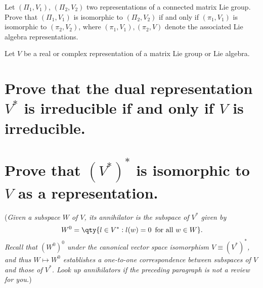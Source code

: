 \documentclass[
	pages,
	boxes,
	color=WildStrawberry
]{homework}
\begin{document}
\begin{problem}
Let $(\Pi_1, V_1)$, $(\Pi_2, V_2)$ two representations of a connected matrix Lie group. Prove that $(\Pi_1, V_1)$ is isomorphic to $(\Pi_2, V_2)$ if and only if $(\pi_1, V_1)$ is isomorphic to $(\pi_2, V_2)$, where $(\pi_1, V_1), (\pi_2, V)$ denote the associated Lie algebra representations.
\end{problem}

\begin{solution}

\end{solution}

\begin{problem}
Let $V$ be a real or complex representation of a matrix Lie group or Lie algebra.
\begin{parts}
	\part{Prove that the dual representation $V^*$ is irreducible if and only if $V$ is irreducible.}\label{part:3a}
	\part{Prove that $(V^*)^*$ is isomorphic to $V$ as a representation.}\label{part:3b}

	(\textit{Given a subspace $W$ of $V$, its annihilator is the subspace of $V^*$ given by
		\[
			W^{0}= \qty{l \in V^* : l(w) = 0 \,\text{ for all }w \in W}.
		\]
		Recall that $(W^{0})^{0}$ under the canonical vector space isomorphism $V \equiv (V^*)^*$, and thus $W \mapsto W^{0}$ establishes a one-to-one correspondence between subspaces of $V$ and those of $V^*$. Look up annihilators if the preceding paragraph is not a review for you.})
\end{parts}
\end{problem}
\end{document}
